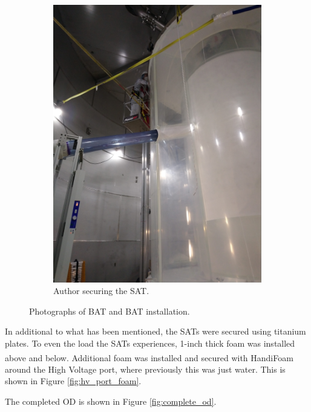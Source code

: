 \begin{figure}[!htbp]
\begin{subfigure}{.5\textwidth}
  \includegraphics[width=\linewidth]{Figures/Construction/SAT_titanium_plate.JPG}
  \caption{Author securing the SAT.}
  \label{fig:SAT_titanium_installation}
  \end{subfigure}
\caption{Photographs of BAT and BAT installation.}
\label{fig:sat_and_bat_installation}
\end{figure}

\par
In additional to what has been mentioned, the SATs were secured using titanium plates.
To even the load the SATs experiences, 1-inch thick foam was installed above and below.
Additional foam was installed and secured with HandiFoam\textsuperscript{\textregistered} around the High Voltage port, where previously this was just water.
This is shown in Figure \ref{fig:hv_port_foam}.

\par
The completed OD is shown in Figure \ref{fig:complete_od}.

